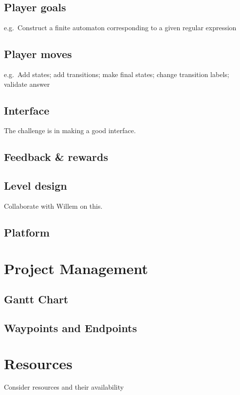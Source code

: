 \documentclass[a4paper,11pt]{article}
\begin{document}
\subsection{Player goals}
e.g.\ Construct a finite automaton corresponding to a given regular expression

\subsection{Player moves}
e.g.\ Add states; add transitions; make final states; change transition labels; validate answer

\subsection{Interface}
The challenge is in making a good interface.

\subsection{Feedback \& rewards}

\subsection{Level design}
Collaborate with Willem on this.

\subsection{Platform}


\section{Project Management} %
\subsection{Gantt Chart}
\subsection{Waypoints and Endpoints}

\section{Resources} %
Consider resources and their availability

\newpage
\printbibliography
\end{document}
